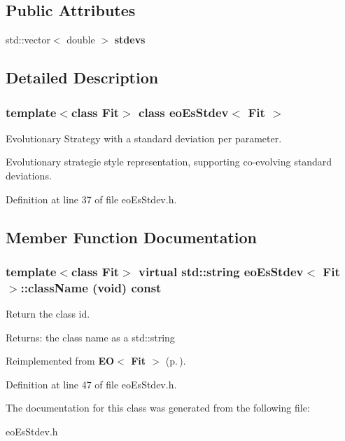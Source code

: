 \subsection*{Public Attributes}
\begin{CompactItemize}
\item 
std::vector$<$ double $>$ {\bf stdevs}\label{classeo_es_stdev_o0}

\end{CompactItemize}


\subsection{Detailed Description}
\subsubsection*{template$<$class Fit$>$ class eo\-Es\-Stdev$<$ Fit $>$}

Evolutionary Strategy with a standard deviation per parameter. 

Evolutionary strategie style representation, supporting co-evolving standard deviations. 



Definition at line 37 of file eo\-Es\-Stdev.h.

\subsection{Member Function Documentation}
\subsubsection{\setlength{\rightskip}{0pt plus 5cm}template$<$class Fit$>$ virtual std::string {\bf eo\-Es\-Stdev}$<$ Fit $>$::class\-Name (void) const\hspace{0.3cm}{\tt  [inline, virtual]}}\label{classeo_es_stdev_a1}


Return the class id. 

\begin{Desc}
\item[Returns:]the class name as a std::string \end{Desc}


Reimplemented from {\bf EO$<$ Fit $>$} {\rm (p.\,\pageref{class_e_o_z10_0})}.

Definition at line 47 of file eo\-Es\-Stdev.h.

The documentation for this class was generated from the following file:\begin{CompactItemize}
\item 
eo\-Es\-Stdev.h\end{CompactItemize}
